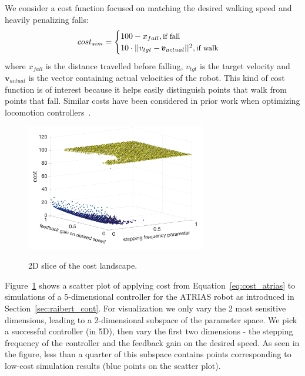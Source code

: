 We consider a cost function focused on matching the desired walking speed and heavily penalizing falls:
\begin{equation}
cost_{sim} = 		
    \begin{cases}
		100 - x_{fall} , \text{\small{if fall}} \\
		10 \cdot || v_{tgt} - \pmb{v}_{actual} ||^2, \text{\small{if walk}}\\
	\end{cases}
\label{eq:cost_atrias}
\end{equation}
where $x_{fall}$ is the distance travelled before falling, $v_{tgt}$ is the target velocity and $\pmb{v}_{actual}$ is the vector containing actual velocities of the robot. This kind of cost function is of interest because it helps easily distinguish points that walk from points that fall. Similar costs have been considered in prior work when optimizing locomotion controllers~\citep{song2015neural}.

\begin{figure}[t]
\centering
\caption{\small{2D slice of the cost landscape.}}
\includegraphics[width=0.7\textwidth]{img/costs_atrias.png}
\label{fig:atrias_cost_landscape}
\end{figure}

Figure~\ref{fig:atrias_cost_landscape} shows a scatter plot of applying cost from Equation~\ref{eq:cost_atrias} to simulations of a 5-dimensional controller for the ATRIAS robot as introduced in Section~\ref{sec:raibert_cont}. For visualization we only vary the 2 most sensitive dimensions, leading to a 2-dimensional subspace of the parameter space. We pick a successful controller (in 5D), then vary the first two dimensions - the stepping frequency of the controller and the feedback gain on the desired speed. As seen in the figure, less than a quarter of this subspace contains points corresponding to low-cost simulation results (blue points on the scatter plot). 

